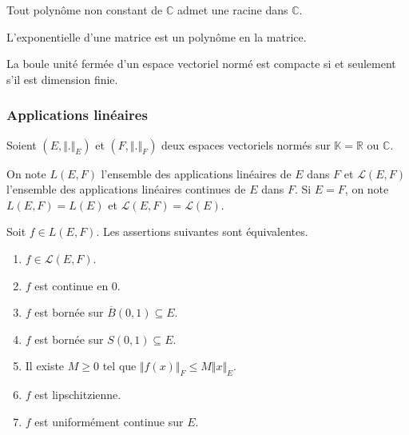
	\begin{application}
		Tout polynôme non constant de $\mathbb{C}$ admet une racine dans $\mathbb{C}$.
	\end{application}


	\begin{application}
		L'exponentielle d'une matrice est un polynôme en la matrice.
	\end{application}


	\begin{theorem}[Riesz]
		La boule unité fermée d'un espace vectoriel normé est compacte si et seulement s'il est dimension finie.
	\end{theorem}

	\subsubsection{Applications linéaires}


	Soient $(E, \Vert . \Vert_E)$ et $(F, \Vert . \Vert_F)$ deux espaces vectoriels normés sur $\mathbb{K} = \mathbb{R}$ ou $\mathbb{C}$.

	\begin{notation}
		On note $L(E,F)$ l'ensemble des applications linéaires de $E$ dans $F$ et $\mathcal{L}(E,F)$ l'ensemble des applications linéaires continues de $E$ dans $F$. Si $E = F$, on note $L(E,F) = L(E)$ et $\mathcal{L}(E,F) = \mathcal{L}(E)$.
	\end{notation}

	\begin{theorem}
		Soit $f \in L(E,F)$. Les assertions suivantes sont équivalentes.
		\begin{enumerate}[label=(\roman*)]
			\item $f \in \mathcal{L}(E,F)$.
			\item $f$ est continue en $0$.
			\item $f$ est bornée sur $\overline{B}(0,1) \subseteq E$.
			\item $f$ est bornée sur $S(0,1) \subseteq E$.
			\item Il existe $M \geq 0$ tel que $\Vert f(x) \Vert_F \leq M \Vert x \Vert_E$.
			\item $f$ est lipschitzienne.
			\item $f$ est uniformément continue sur $E$.
		\end{enumerate}
	\end{theorem}

